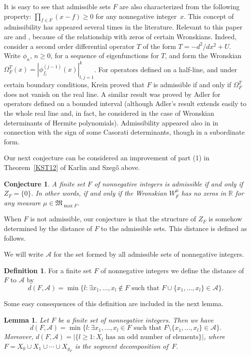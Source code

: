 \documentclass[10pt]{article}
\theoremstyle{plain}
\newtheorem{lemma}[theorem]{Lemma}
\newtheorem{conjecture}[theorem]{Conjecture}
\theoremstyle{definition}
\newtheorem{definition}[theorem]{Definition}
\numberwithin{equation}{section} %
\newcommand\Ad{\mathcal{A}}
\newcommand\RR{\mathbb{R}}
\newcommand\M{\mathfrak{M}}
\begin{document}
It is easy to see that admissible sets $F$ are also characterized from the following property: $\prod_{f\in F}(x-f)\ge 0$ for any nonnegative integer~$x$.
This concept of admissibility has appeared several times in the literature. Relevant to this paper are \cite{Kr} and \cite{Ad}, because of the relationship with zeros of certain Wronskians. Indeed, consider a second order differential operator $T$ of the form $T=-d^2/dx^2+U$. Write $\phi_n$, $n\ge 0$, for a sequence of eigenfunctions for $T$, and form the Wronskian $\Omega_F^T(x)=|\phi_{f_l}^{(j-1)}(x)|_{l,j=1}^k$.
For operators defined on a half-line, and under certain boundary conditions, Krein proved \cite{Kr} that $F$ is admissible if and only if $\Omega _F^T$ does not vanish on the real line. A similar result was proved by Adler \cite{Ad} for operators defined on a bounded interval (although Adler's result extends easily  to the whole real line and, in fact, he considered in \cite{Ad} the case of Wronskian determinants of Hermite polynomials). Admissibility appeared also in \cite{KS} in connection with the sign of some Casorati determinants, though in a subordinate form.

Our next conjecture can be considered an improvement of part (1) in Theorem~\ref{KST12} of Karlin and Szeg\H{o} above.

\begin{conjecture}
\label{c-adm}
A finite set $F$ of nonnegative integers is admissible if and only if $Z_F=\{0\}$. In other words, if and only if
the Wronskian $W_F^\mu$ has no zeros in $\RR$ for any measure  $\mu\in \M _{\max F}$.
\end{conjecture}

When $F$ is not admissible, our conjecture is that the structure of $Z_F$ is somehow determined by the distance of $F$ to the admissible sets. This distance is defined as follows.

We will write $\Ad$ for the set formed by all admissible sets of nonnegative integers.

\begin{definition}
For a finite set $F$ of nonnegative integers we define the distance of $F$ to
$\Ad$ by
\[
   d(F,\Ad) = \min \big\{l: \exists x_1, \dots, x_l \notin F
   \text{ such that }
   F\cup \{x_1,\dots, x_l\} \in \Ad \big\}.
\]
\end{definition}

Some easy consequences of this definition are included in the next lemma.

\begin{lemma}
\label{lem1}
Let $F$ be a finite set of nonnegative integers. Then we have
\[
   d(F,\Ad) = \min \big\{l: \exists x_1, \dots, x_l \in F
   \text{ such that }
   F\setminus \{x_1,\dots, x_l\} \in \Ad \big\}.
\]
Moreover, $d(F,\Ad) = |\{l \geq 1: X_l \text{ has an odd number of elements} \}|$,
where $F = X_0 \cup X_1 \cup \dotsb \cup X_{g_F}$ is the segment decomposition of~$F$.
\end{lemma}
\end{document}
